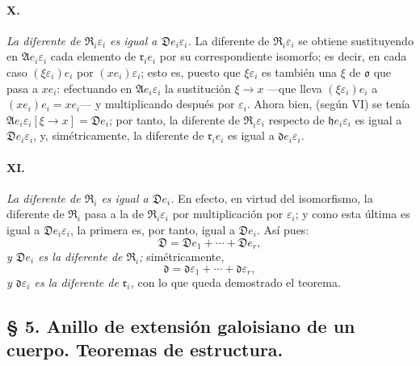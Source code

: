 \paragraph{X.}
\emph{La diferente de $\mathfrak R_i\varepsilon_i$ es igual a $\mathfrak D e_i\varepsilon_i$.} La diferente de $\mathfrak R_i\varepsilon_i$ se obtiene sustituyendo en $\mathfrak A e_i\varepsilon_i$ cada elemento de $\mathfrak r_i e_i$ por su correspondiente isomorfo; es decir, en cada caso $(\xi\varepsilon_i)e_i$ por $(xe_i)\varepsilon_i$; esto es, puesto que $\xi\varepsilon_i$ es también una $\xi$ de $\mathfrak o$ que pasa a $xe_i$: efectuando en $\mathfrak A e_i\varepsilon_i$ la sustitución $\xi\to x$ ---que lleva $(\xi\varepsilon_i)e_i$ a $(xe_i)e_i=xe_i$--- y multiplicando después por $\varepsilon_i$. Ahora bien, (según VI) se tenía $\mathfrak A e_i\varepsilon_i[\xi\to x]=\mathfrak D e_i$; por tanto, la diferente de $\mathfrak R_i\varepsilon_i$ respecto de $\mathfrak h e_i\varepsilon_i$ es igual a $\mathfrak D e_i\varepsilon_i$, y, simétricamente, la diferente de $\mathfrak r_i e_i$ es igual a $\mathfrak d e_i\varepsilon_i$.

\paragraph{XI.}
\emph{La diferente de $\mathfrak R_i$ es igual a $\mathfrak D e_i$.} En efecto, en virtud del isomorfismo, la diferente de $\mathfrak R_i$ pasa a la de $\mathfrak R_i\varepsilon_i$ por multiplicación por $\varepsilon_i$; y como esta última es igual a $\mathfrak D e_i\varepsilon_i$, la primera es, por tanto, igual a $\mathfrak D e_i$. Así pues:
\[
\mathfrak D=\mathfrak D e_1+\cdots+\mathfrak D e_r,
\]
\emph{y $\mathfrak D e_i$ es la diferente de $\mathfrak R_i$;} simétricamente,
\[
\mathfrak d=\mathfrak d\varepsilon_1+\cdots+\mathfrak d\varepsilon_r,
\]
\emph{y $\mathfrak d\varepsilon_i$ es la diferente de $\mathfrak r_i$,} con lo que queda demostrado el teorema.
\subsection*{\S{} 5. Anillo de extensión galoisiano de un cuerpo. Teoremas de estructura.}

